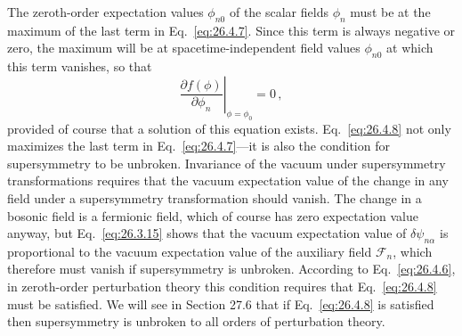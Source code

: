 The zeroth-order expectation values \(\phi_{n0}\) of the scalar fields
\(\phi_n\) must be at the maximum of the last term in Eq.~\eqref{eq:26.4.7}.
Since this term is always negative or zero, the maximum will be at
spacetime-independent field values \(\phi_{n0}\) at which this term vanishes,
so that
\begin{equation}
  \left.
  \frac{\partial f(\phi)}{\partial\phi_n}
  \right|_{\phi=\phi_0}=0\,,
  \tag{26.4.8}\label{eq:26.4.8}
\end{equation}
provided of course that a solution of this equation exists.
Eq.~\eqref{eq:26.4.8} not only maximizes the last term in
Eq.~\eqref{eq:26.4.7}---it is also the condition for supersymmetry to be
unbroken. Invariance of the vacuum under supersymmetry transformations
requires that the vacuum expectation value of the change in any field under a
supersymmetry transformation should vanish. The change in a bosonic field is
a fermionic field, which of course has zero expectation value anyway, but
Eq.~\eqref{eq:26.3.15} shows that the vacuum expectation value of
\(\delta\psi_{n\alpha}\) is proportional to the vacuum expectation value of the
auxiliary field \(\mathcal{F}_n\), which therefore must vanish if
supersymmetry is unbroken. According to Eq.~\eqref{eq:26.4.6}, in zeroth-order
perturbation theory this condition requires that Eq.~\eqref{eq:26.4.8} must be
satisfied. We will see in Section 27.6 that if Eq.~\eqref{eq:26.4.8} is
satisfied then supersymmetry is unbroken to all orders of perturbation theory.

